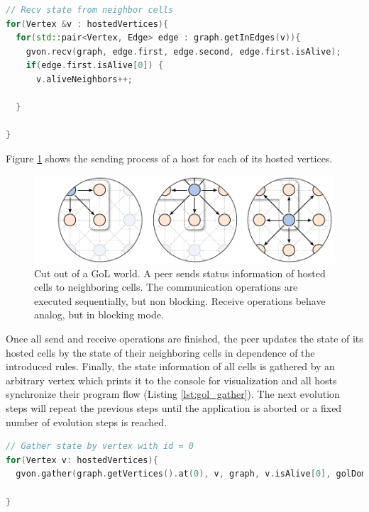 \begin{lstlisting}[language=C++, label=lst:gol_recv, caption={\ }]
// Recv state from neighbor cells
for(Vertex &v : hostedVertices){
  for(std::pair<Vertex, Edge> edge : graph.getInEdges(v)){
    gvon.recv(graph, edge.first, edge.second, edge.first.isAlive);
    if(edge.first.isAlive[0]) { 
      v.aliveNeighbors++;

  }

}
\end{lstlisting}

\noindent Figure \ref{fig:gol_communication} shows the sending process of a host
for each of its hosted vertices.

\begin{figure}[H]
  \centering
  \includegraphics[width=\textwidth]{graphics/40_gol_communication}
  \caption{Cut out of a GoL world. A peer sends status information of
    hosted cells to neighboring cells. The communication operations
    are executed sequentially, but non blocking. Receive operations
    behave analog, but in blocking mode.}
  \label{fig:gol_communication}
\end{figure}

\noindent Once all send and receive operations are finished, the peer
updates the state of its hosted cells by the state of their
neighboring cells in dependence of the introduced rules. Finally, the
state information of all cells is gathered by an arbitrary vertex
which prints it to the console for visualization and all hosts
synchronize their program flow (Listing \ref{lst:gol_gather}). The
next evolution steps will repeat the previous steps until the
application is aborted or a fixed number of evolution steps is
reached.

\begin{lstlisting}[language=C++, label=lst:gol_gather, caption={\ } ]
// Gather state by vertex with id = 0
for(Vertex v: hostedVertices){
  gvon.gather(graph.getVertices().at(0), v, graph, v.isAlive[0], golDomain);

}
\end{lstlisting}


